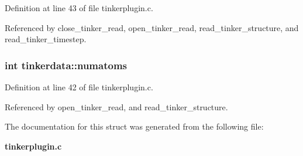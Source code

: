 Definition at line 43 of file tinkerplugin.c.

Referenced by close\_\-tinker\_\-read, open\_\-tinker\_\-read, read\_\-tinker\_\-structure, and read\_\-tinker\_\-timestep.
\subsubsection{\setlength{\rightskip}{0pt plus 5cm}int tinkerdata::numatoms}\label{structtinkerdata_m1}




Definition at line 42 of file tinkerplugin.c.

Referenced by open\_\-tinker\_\-read, and read\_\-tinker\_\-structure.

The documentation for this struct was generated from the following file:\begin{CompactItemize}
\item 
{\bf tinkerplugin.c}\end{CompactItemize}

